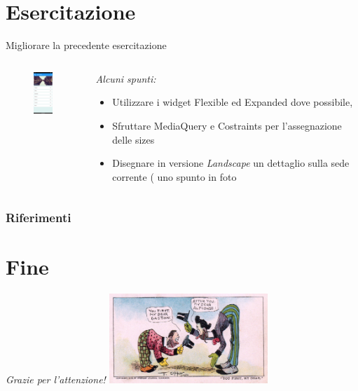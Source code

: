 \documentclass{../libs/presentation_format}
\begin{document}
\section{Esercitazione}
\begin{frame}{Migliorare la precedente esercitazione}
	\begin{minipage}[0.2\textheight]{\textwidth}
		\begin{columns}[T]
			\begin{column}{0.4\textwidth}
				\begin{figure}[htpb]
					\centering
					\includegraphics[width=2cm]{../libs/assignment-2-home}
				\end{figure}
			\end{column}
			\begin{column}{0.6\textwidth}
				\emph{Alcuni spunti:}
				\begin{itemize}
					\item Utilizzare i widget Flexible ed Expanded dove possibile,
					\item Sfruttare MediaQuery e Costraints per l'assegnazione delle sizes
					\item Disegnare in versione \emph{Landscape} un dettaglio sulla sede corrente ( uno spunto in foto
				\end{itemize}
			\end{column}
		\end{columns}
	\end{minipage}
\end{frame}



\begin{frame}[allowframebreaks]
    \frametitle{Riferimenti}
    \printbibliography
\end{frame}

\section{Fine}
\begin{frame}{}
	\huge\emph{Grazie per l'attenzione!}
	\newline
	\vfill
	\hfill\includegraphics[width=6cm]{../libs/alphonse-gaston-regards}
\end{frame}
\end{document}
